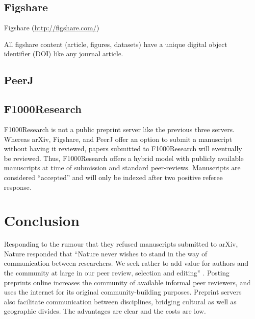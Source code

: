 \documentclass[letterpaper,twocolumn,superscriptaddress,showkeys]{revtex4}
\begin{document}
\subsection{Figshare}


Figshare (\href{http://figshare.com/}{http://figshare.com/})

All figshare content (article, figures, datasets) have a unique digital object
identifier (DOI) like any journal article.

\subsection{PeerJ}


\subsection{F1000Research}


F1000Research is not a public preprint server like the previous three servers.
Whereas arXiv, Figshare, and PeerJ offer an option to submit a manuscript
without having it reviewed, papers submitted to F1000Research will eventually be
reviewed. Thus, F1000Research offers a hybrid model with publicly available
manuscripts at time of submission and standard peer-reviews. Manuscripts are
considered ``accepted'' and will only be indexed after two positive referee
response.

\section{Conclusion}


Responding to the rumour that they refused manuscripts submitted to arXiv,
Nature responded that ``Nature never wishes to stand in the way of communication
between researchers. We seek rather to add value for authors and the community
at large in our peer review, selection and editing'' \cite{nat05}.
Posting preprints online increases the community of available informal
peer reviewers, and uses the internet for its original
community-building purposes.  Preprint servers also facilitate
communication between disciplines, bridging cultural as well as
geographic divides.
The advantages are clear and the costs are low.

\newpage


\end{document}
